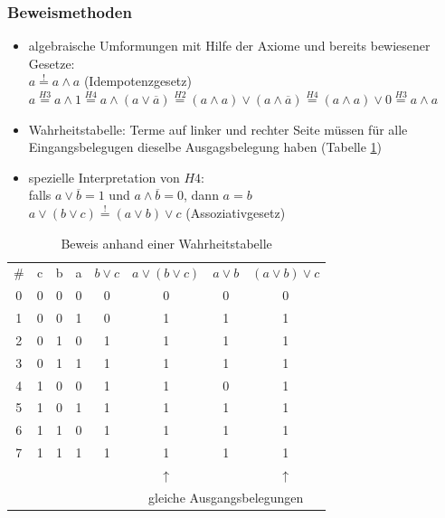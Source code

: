 \documentclass[10pt,a4paper]{scrartcl}
\begin{document}
\subsubsection{Beweismethoden}
\begin{itemize}
	\item algebraische Umformungen mit Hilfe der Axiome und bereits bewiesener Gesetze: \\
	$ a \overset{!}{=} a \wedge a $ (Idempotenzgesetz)\\
	$ a \overset{H3}{=} a \wedge 1 \overset{H4}{=} a \wedge ( a \vee \overline{a} ) \overset{H2}{=} (a \wedge a) \vee (a \wedge \overline{a}) \overset{H4}{=} (a \wedge a) \vee 0 \overset{H3}{=} a \wedge a$
	\item Wahrheitstabelle: Terme auf linker und rechter Seite müssen für alle Eingangsbelegugen dieselbe Ausgagsbelegung haben (Tabelle \ref{tab:beweiswhtbl})
	\item spezielle Interpretation von $H4$:\\
	falls $ a \vee \overline{b} = 1 $ und $ a \wedge \overline{b} = 0 $, dann $ a = b $\\
	$ a \vee (b \vee c) \overset{!}{=} (a \vee b) \vee c $ (Assoziativgesetz)
\end{itemize}

\begin{table}[h!]
	\centering
	\begin{tabular}{c|ccc|c|c|c|c}
	\# & c & b & a & $ b \vee c $ & $ a \vee (b \vee c) $ & $ a \vee b $ & $ (a \vee b) \vee c$\\
	0 & 0 & 0 & 0 & 0 & 0 & 0 & 0\\
	1 & 0 & 0 & 1 & 0 & 1 & 1 & 1\\
	2 & 0 & 1 & 0 & 1 & 1 & 1 & 1\\
	3 & 0 & 1 & 1 & 1 & 1 & 1 & 1\\
	4 & 1 & 0 & 0 & 1 & 1 & 0 & 1\\
	5 & 1 & 0 & 1 & 1 & 1 & 1 & 1\\
	6 & 1 & 1 & 0 & 1 & 1 & 1 & 1\\
	7 & 1 & 1 & 1 & 1 & 1 & 1 & 1\\
	 \multicolumn{5}{c}{}& \multicolumn{1}{c}{$\uparrow$}&\multicolumn{1}{c}{}& $\uparrow$\\
	 \multicolumn{5}{c}{}&\multicolumn{3}{c}{gleiche Ausgangsbelegungen}
\end{tabular}
\label{tab:beweiswhtbl}
\caption{Beweis anhand einer Wahrheitstabelle}
\end{table}
\end{document}
